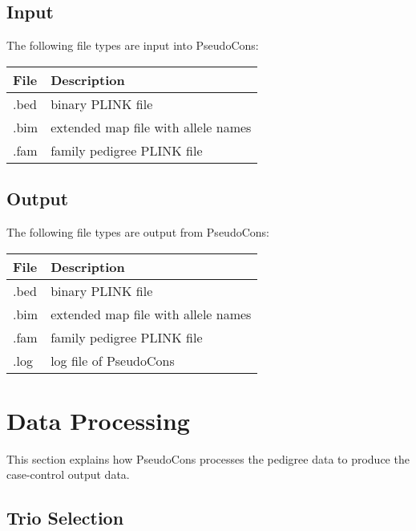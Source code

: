 \documentclass[a4paper,12pt]{article}
\begin{document}

\subsection{Input}
\label{input}

The following file types are input into PseudoCons: 

{\begin{center}\begin{tabular}{ll}
File  & Description\\
\hline
.bed  & binary PLINK file\\
.bim  & extended map file with allele names\\
.fam  & family pedigree PLINK file\\
\end{tabular}\end{center}}


\subsection{Output}
\label{output}

The following file types are output from PseudoCons: 

{\begin{center}\begin{tabular}{ll}
File  & Description\\
\hline
.bed  & binary PLINK file\\
.bim  & extended map file with allele names\\
.fam  & family pedigree PLINK file\\
.log  & log file of PseudoCons\\
\end{tabular}\end{center}}




\section{Data Processing}
\label{data}

This section explains how PseudoCons processes the pedigree data to produce the case-control output data. 
\subsection{Trio Selection}
\label{trios}
\end{document}
